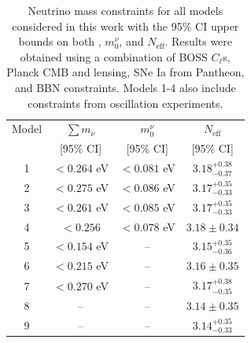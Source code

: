 \begin{table}
  \centering
  \caption{Neutrino mass constraints for all models considered in this work with the 95\% CI upper bounds on both \NM, $m_{0}^{\nu}$, and $N_{\text{eff}}$. Results were obtained using a combination of BOSS $C_{\ell}$s, Planck CMB and lensing, SNe Ia from Pantheon, and BBN constraints. Models 1-4 also include constraints from oscillation experiments.}
  \label{Tb:Models}
  \begin{tabular}{c|ccc}
    \hline
    \hline
    Model & $\sum m_{\nu}$ & $m_0^{\nu}$ & $N_{\text{eff}}$\\
    & \small{[95\% CI]} & \small{[95\% CI]} & \small{[95\% CI]}\\[0.1cm]
    \hline
    \hline

     1 &  $< 0.264$ eV & $< 0.081$ eV & $3.18^{+0.38}_{-0.37}$\\
     2 & $<0.275$ eV & $< 0.086$ eV & $3.17^{+0.35}_{-0.33}$ \\
     3 &  $< 0.261$ eV & $< 0.085$ eV & $3.17^{+0.35}_{-0.33}$ \\
     4 &  $< 0.256$ & $< 0.078$ eV & $3.18\pm 0.34$ \\
     \hline
     5 & $< 0.154$ eV & -- & $3.15^{+0.35}_{-0.36}$ \\
     6 & $< 0.215$ eV & -- &  $3.16\pm 0.35$ \\
     7 & $< 0.270$ eV & -- & $3.17^{+0.38}_{-0.35}$ \\
     \hline
     8 & -- & -- & $3.14\pm 0.35$ \\
     9 & -- & -- & $3.14^{+0.35}_{-0.33}$ \\
     \hline
     \hline
  \end{tabular}
\end{table}

